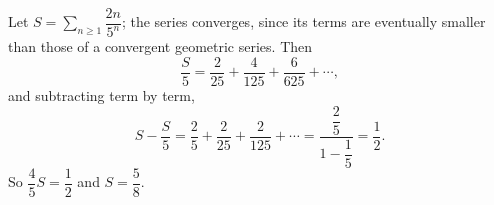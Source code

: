 Let $S=\displaystyle\sum_{n\ge1}\dfrac{2n}{5^n}$; the series converges, since its terms are eventually smaller than those of a convergent geometric series. Then
\[
\dfrac {S}{5}=\dfrac{2}{25}+\dfrac{4}{125}+\dfrac{6}{625}+\cdots ,
\]
and subtracting term by term,
\[
S-\dfrac {S}{5}=\dfrac{2}{5}+\dfrac{2}{25}+\dfrac{2}{125}+\cdots=\dfrac{\dfrac{2}{5}}{1-\dfrac{1}{5}}=\dfrac{1}{2} .
\]
So $\dfrac{4}{5}S=\dfrac{1}{2}$ and $S=\boxed{\dfrac{5}{8}}$.
